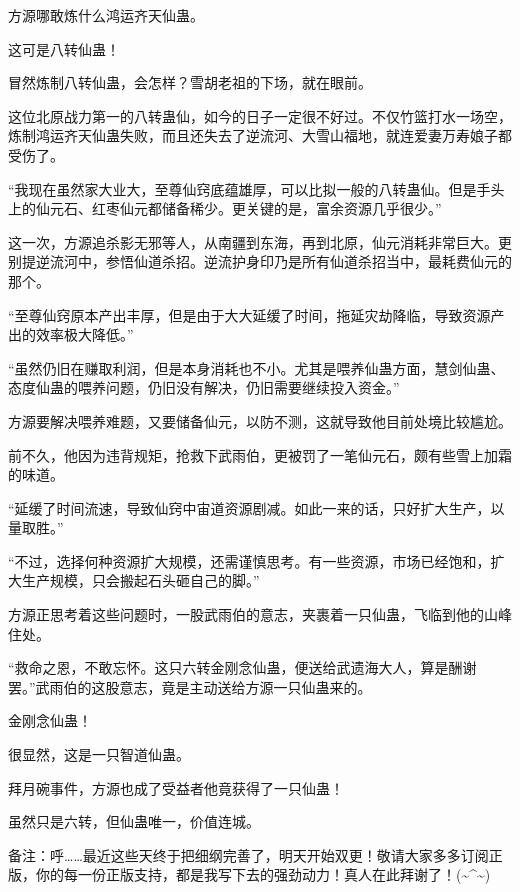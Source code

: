 \begin{this_body}
方源哪敢炼什么鸿运齐天仙蛊。

这可是八转仙蛊！

冒然炼制八转仙蛊，会怎样？雪胡老祖的下场，就在眼前。

这位北原战力第一的八转蛊仙，如今的日子一定很不好过。不仅竹篮打水一场空，炼制鸿运齐天仙蛊失败，而且还失去了逆流河、大雪山福地，就连爱妻万寿娘子都受伤了。

“我现在虽然家大业大，至尊仙窍底蕴雄厚，可以比拟一般的八转蛊仙。但是手头上的仙元石、红枣仙元都储备稀少。更关键的是，富余资源几乎很少。”

这一次，方源追杀影无邪等人，从南疆到东海，再到北原，仙元消耗非常巨大。更别提逆流河中，参悟仙道杀招。逆流护身印乃是所有仙道杀招当中，最耗费仙元的那个。

“至尊仙窍原本产出丰厚，但是由于大大延缓了时间，拖延灾劫降临，导致资源产出的效率极大降低。”

“虽然仍旧在赚取利润，但是本身消耗也不小。尤其是喂养仙蛊方面，慧剑仙蛊、态度仙蛊的喂养问题，仍旧没有解决，仍旧需要继续投入资金。”

方源要解决喂养难题，又要储备仙元，以防不测，这就导致他目前处境比较尴尬。

前不久，他因为违背规矩，抢救下武雨伯，更被罚了一笔仙元石，颇有些雪上加霜的味道。

“延缓了时间流速，导致仙窍中宙道资源剧减。如此一来的话，只好扩大生产，以量取胜。”

“不过，选择何种资源扩大规模，还需谨慎思考。有一些资源，市场已经饱和，扩大生产规模，只会搬起石头砸自己的脚。”

方源正思考着这些问题时，一股武雨伯的意志，夹裹着一只仙蛊，飞临到他的山峰住处。

“救命之恩，不敢忘怀。这只六转金刚念仙蛊，便送给武遗海大人，算是酬谢罢。”武雨伯的这股意志，竟是主动送给方源一只仙蛊来的。

金刚念仙蛊！

很显然，这是一只智道仙蛊。

拜月碗事件，方源也成了受益者他竟获得了一只仙蛊！

虽然只是六转，但仙蛊唯一，价值连城。

备注：呼……最近这些天终于把细纲完善了，明天开始双更！敬请大家多多订阅正版，你的每一份正版支持，都是我写下去的强劲动力！真人在此拜谢了！(\~{}\^{}\~{})

\end{this_body}

